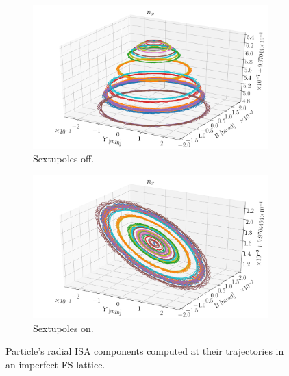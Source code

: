 \begin{figure}[!h]
	\centering
	\begin{subfigure}{\linewidth}
		\includegraphics[width=\linewidth]{images/decoh_sim/NX_VS_YB_IMPERFECT_UNOPT}
		\caption{Sextupoles off.}
	\end{subfigure}
	\begin{subfigure}{\linewidth}
		\includegraphics[width=\linewidth]{images/decoh_sim/NX_VS_YB_IMPERFECT_OPTIM}
		\caption{Sextupoles on.}
	\end{subfigure}
	\caption{Particle's radial ISA components computed at their trajectories
          in an imperfect FS lattice.\label{decoh:fig:NX_on_traj}}
\end{figure}

